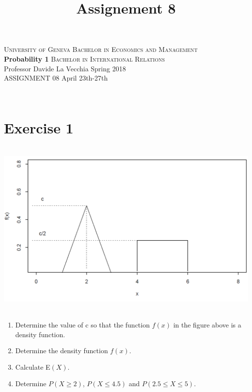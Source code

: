 \documentclass[12pt,thmsa]{article}
\title{Assignement 8}
\begin{document}
\noindent \textsc{University of Geneva}     \hfill \textsc{Bachelor in Economics and Management} \\
\textbf{Probability 1}                      \hfill \textsc{Bachelor in International Relations} \\
Professor Davide La Vecchia                 \hfill Spring 2018  \\
ASSIGNMENT 08                               \hfill   April 23th-27th



\noindent
\makebox[\linewidth]{\rule{\textwidth}{0.4pt}}\\[1.5ex]

\section*{Exercise 1}
\centerline{\includegraphics[height=9cm]{figure.png}}
\bigskip

\begin{enumerate}%
\item Determine the value of c so that the function $f(x)$ in the figure above is a density function. %

\item Determine the density function $f(x)$.
\item Calculate E$(X)$.
\item Determine $P(X \geq 2)$, $P(X \leq 4.5)$ and $P(2.5 \leq X \leq
5)$.
\end{enumerate}
\end{document}
